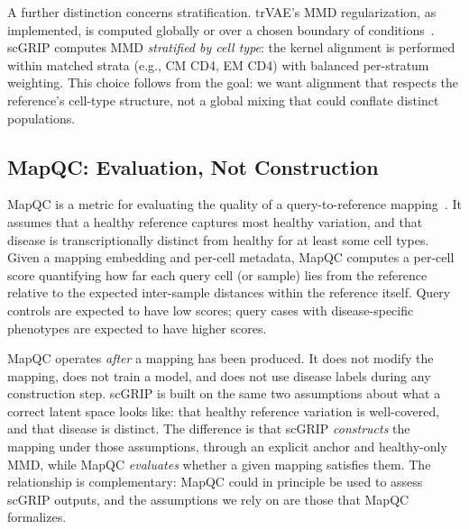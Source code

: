 \documentclass[12pt, a4paper]{article}
\begin{document}
A further distinction concerns stratification. trVAE's MMD regularization, as implemented, is computed globally or over a chosen boundary of conditions~\cite{scarches_trvae}. scGRIP computes MMD \emph{stratified by cell type}: the kernel alignment is performed within matched strata (e.g., CM CD4, EM CD4) with balanced per-stratum weighting. This choice follows from the goal: we want alignment that respects the reference's cell-type structure, not a global mixing that could conflate distinct populations.

\subsection{MapQC: Evaluation, Not Construction}

MapQC is a metric for evaluating the quality of a query-to-reference mapping~\cite{mapqc_preprint}. It assumes that a healthy reference captures most healthy variation, and that disease is transcriptionally distinct from healthy for at least some cell types. Given a mapping embedding and per-cell metadata, MapQC computes a per-cell score quantifying how far each query cell (or sample) lies from the reference relative to the expected inter-sample distances within the reference itself. Query controls are expected to have low scores; query cases with disease-specific phenotypes are expected to have higher scores.

MapQC operates \emph{after} a mapping has been produced. It does not modify the mapping, does not train a model, and does not use disease labels during any construction step. scGRIP is built on the same two assumptions about what a correct latent space looks like: that healthy reference variation is well-covered, and that disease is distinct. The difference is that scGRIP \emph{constructs} the mapping under those assumptions, through an explicit anchor and healthy-only MMD, while MapQC \emph{evaluates} whether a given mapping satisfies them. The relationship is complementary: MapQC could in principle be used to assess scGRIP outputs, and the assumptions we rely on are those that MapQC formalizes.
\end{document}
